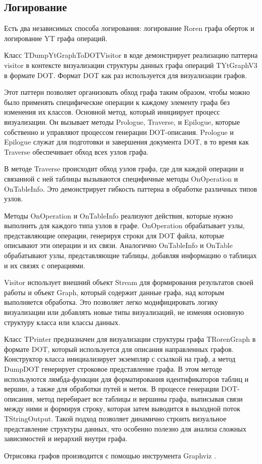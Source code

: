 \subsection{Логирование}

Есть два независимых способа логирования: логирование Roren графа оберток и логирование YT графа операций.

Класс TDumpYtGraphToDOTVisitor в коде демонстрирует реализацию паттерна visitor в контексте визуализации структуры данных графа операций TYtGraphV3 в формате DOT. Формат DOT как раз используется для визуализации графов.

Этот паттерн позволяет организовать обход графа таким образом, чтобы можно было применять специфические операции к каждому элементу графа без изменения их классов. Основной метод, который инициирует процесс визуализации. Он вызывает методы Prologue, Traverse, и Epilogue, которые собственно и управляют процессом генерации DOT-описания. Prologue и Epilogue служат для подготовки и завершения документа DOT, в то время как Traverse обеспечивает обход всех узлов графа.

В методе Traverse происходит обход узлов графа, где для каждой операции и связанной с ней таблицы вызываются специфичные методы OnOperation и OnTableInfo. Это демонстрирует гибкость паттерна в обработке различных типов узлов.

Методы OnOperation и OnTableInfo реализуют действия, которые нужно выполнить для каждого типа узлов в графе. OnOperation обрабатывает узлы, представляющие операции, генерируя строки для DOT файла, которые описывают эти операции и их связи. Аналогично OnTableInfo и OnTable обрабатывают узлы, представляющие таблицы, добавляя информацию о таблицах и их связях с операциями.

Visitor использует внешний объект Stream для формирования результатов своей работы и объект Graph, который содержит данные графа, над которым выполняется обработка. Это позволяет легко модифицировать логику визуализации или добавлять новые типы визуализаций, не изменяя основную структуру класса или классы данных.

Класс TPrinter предназначен для визуализации структуры графа TRorenGraph в формате DOT, который используется для описания направленных графов. Конструктор класса инициализирует экземпляр с ссылкой на граф, а метод DumpDOT генерирует строковое представление графа. В этом методе используются лямбда-функции для форматирования идентификаторов таблиц и вершин, а также для обработки путей и меток. В процессе генерации DOT-описания, метод перебирает все таблицы и вершины графа, выписывая связи между ними и формируя строку, которая затем выводится в выходной поток TStringOutput. Такой подход позволяет динамично строить визуальное представление структуры данных, что особенно полезно для анализа сложных зависимостей и иерархий внутри графа.

Отрисовка графов производится с помощью инструмента Graphviz \cite{graphviz}.
